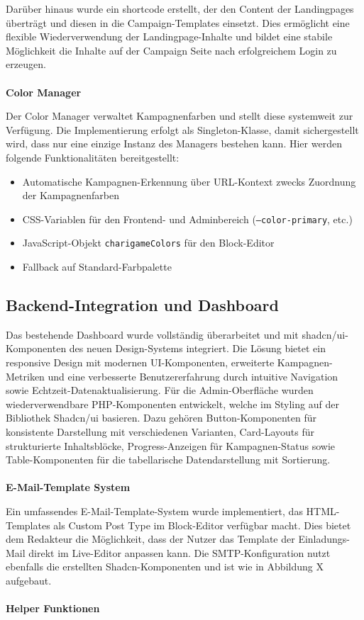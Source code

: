 Darüber hinaus wurde ein \gls{shortcode} erstellt, der den Content der Landingpages überträgt und diesen in die Campaign-Templates einsetzt.
Dies ermöglicht eine flexible Wiederverwendung der Landingpage-Inhalte und bildet eine stabile Möglichkeit die Inhalte auf der Campaign Seite nach erfolgreichem Login zu erzeugen.
\\\\
\textbf{Color Manager}

Der Color Manager verwaltet Kampagnenfarben und stellt diese systemweit zur Verfügung.
Die Implementierung erfolgt als Singleton-Klasse, damit sichergestellt wird, dass nur eine einzige Instanz des Managers bestehen kann.
Hier werden folgende Funktionalitäten bereitgestellt:

\begin{itemize}
    \item Automatische Kampagnen-Erkennung über URL-Kontext zwecks Zuordnung der Kampagnenfarben
    \item CSS-Variablen für den Frontend- und Adminbereich (\texttt{--color-primary}, etc.)
    \item JavaScript-Objekt \texttt{charigameColors} für den Block-Editor
    \item Fallback auf Standard-Farbpalette
\end{itemize}

\subsection{Backend-Integration und Dashboard}

Das bestehende Dashboard wurde vollständig überarbeitet und mit shadcn/ui-Komponenten des neuen Design-Systems integriert.
Die Lösung bietet ein responsive Design mit modernen UI-Komponenten, erweiterte Kampagnen-Metriken und eine verbesserte Benutzererfahrung durch intuitive Navigation sowie Echtzeit-Datenaktualisierung.
Für die Admin-Oberfläche wurden wiederverwendbare PHP-Komponenten entwickelt, welche im Styling auf der Bibliothek Shadcn/ui basieren.
Dazu gehören Button-Komponenten für konsistente Darstellung mit verschiedenen Varianten, Card-Layouts für strukturierte Inhaltsblöcke, Progress-Anzeigen für Kampagnen-Status sowie Table-Komponenten für die tabellarische Datendarstellung mit Sortierung.
\\\\
\textbf{E-Mail-Template System}

Ein umfassendes E-Mail-Template-System wurde implementiert, das HTML-Templates als Custom Post Type im Block-Editor verfügbar macht.
Dies bietet dem Redakteur die Möglichkeit, dass der Nutzer das Template der Einladungs-Mail direkt im Live-Editor anpassen kann.
Die SMTP-Konfiguration nutzt ebenfalls die erstellten Shadcn-Komponenten und ist wie in Abbildung X aufgebaut. %
\\\\
\textbf{Helper Funktionen}

